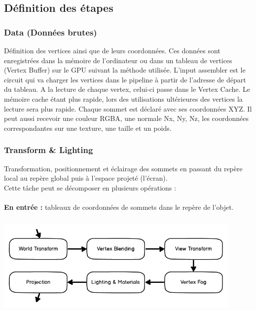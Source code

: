 \subsection{Définition des étapes}
\subsubsection{Data (Données brutes)}
Définition des vertices ainsi que de leurs coordonnées. Ces données sont enregistrées dans la mémoire de l'ordinateur ou dans un tableau de vertices (Vertex Buffer) sur le GPU suivant la méthode utilisée. L’input assembler est le circuit qui va charger les vertices dans le pipeline à partir de l’adresse de départ du tableau. A la lecture de chaque vertex, celui-ci passe dans le Vertex Cache. Le mémoire cache étant plus rapide, lors des utilisations ultérieures des vertices la lecture sera plus rapide.
Chaque sommet est déclaré avec ses coordonnées XYZ. Il peut aussi recevoir une couleur RGBA, une normale Nx, Ny, Nz, les coordonnées correspondantes sur une texture, une taille et un poids.
\subsubsection{Transform \& Lighting}
Transformation, positionnement et éclairage des sommets en passant du repère local au repère global puis à l’espace projeté (l'écran).
\\
Cette tâche peut se décomposer en plusieurs opérations :
\\\\
\textbf{En entrée :} tableaux de coordonnées de sommets dans le repère de l’objet.
\\
\begin{center}
\includegraphics[width=12cm,height=50mm]{pipeline/images/T&L.png}
\end{center}

